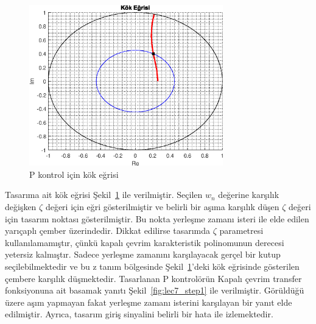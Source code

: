 \begin{figure}[!htb]
    \centering
    \includegraphics[width=0.75\textwidth]{img/lec7_rlocus1}
    \caption{P kontrol için kök eğrisi}
    \label{fig:lec7_rlocus1}
\end{figure}
Tasarıma ait kök eğrisi Şekil~\ref{fig:lec7_rlocus1} ile verilmiştir. Seçilen $w_n$ değerine karşılık değişken $\zeta$ değeri için eğri gösterilmiştir ve belirli bir aşıma karşılık düşen $\zeta$ değeri için tasarım noktası gösterilmiştir. Bu nokta yerleşme zamanı isteri ile elde edilen yarıçaplı çember üzerindedir. Dikkat edilirse tasarımda $\zeta$ parametresi kullanılamamıştır, çünkü kapalı çevrim karakteristik polinomunun derecesi yetersiz kalmıştır. Sadece yerleşme zamanını karşılayacak gerçel bir kutup seçilebilmektedir ve bu z tanım bölgesinde Şekil~\ref{fig:lec7_rlocus1}'deki kök eğrisinde gösterilen çembere karşılık düşmektedir. Tasarlanan P kontrolörün Kapalı çevrim transfer fonksiyonuna ait basamak yanıtı Şekil~\ref{fig:lec7_step1} ile verilmiştir. Görüldüğü üzere aşım yapmayan fakat yerleşme zamanı isterini karşılayan bir yanıt elde edilmiştir. Ayrıca, tasarım giriş sinyalini belirli bir hata ile izlemektedir.